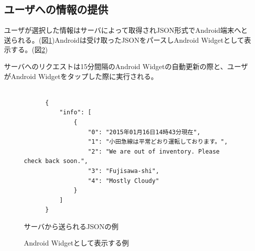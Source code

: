 \subsection{ユーザへの情報の提供}
ユーザが選択した情報はサーバによって取得されJSON形式でAndroid端末へと送られる。(図\ref{fig:JSON})Androidは受け取ったJSONをパースしAndroid Widgetとして表示する。(図\ref{fig:widget})

サーバへのリクエストは15分間隔のAndroid Widgetの自動更新の際と、ユーザがAndroid Widgetをタップした際に実行される。

\begin{figure}[htbp]
  \begin{minipage}{\hsize}
    \begin{center}
      \begin{lstlisting}[basicstyle=\ttfamily\footnotesize, frame=single]

      {
          "info": [
              {
                  "0": "2015年01月16日14時43分現在",
                  "1": "小田急線は平常どおり運転しております。",
                  "2": "We are out of inventory. Please check back soon.",
                  "3": "Fujisawa-shi",
                  "4": "Mostly Cloudy"
              }
          ]
      }

      \end{lstlisting}
    \end{center}
    \caption{サーバから送られるJSONの例}
    \label{fig:JSON}
  \end{minipage}
\end{figure}

\begin{figure}[htbp]
  \begin{minipage}{\hsize}
    \begin{center}
    \end{center}
    \caption{Android Widgetとして表示する例}
    \label{fig:widget}
  \end{minipage}
\end{figure}

\nocite{*}
